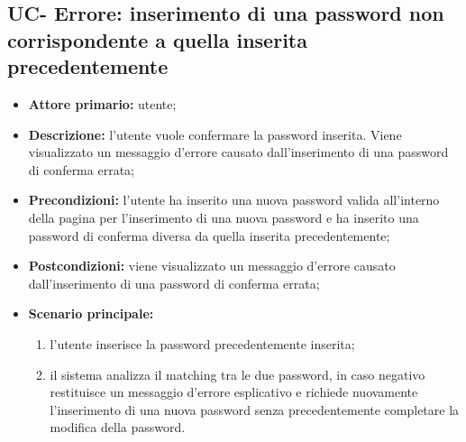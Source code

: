 \subsection{UC- Errore: inserimento di una password non corrispondente a quella inserita precedentemente}
\begin{itemize}
	\item \textbf{Attore primario:} utente;

	\item\textbf{Descrizione:} l'utente vuole confermare la password inserita. Viene visualizzato un messaggio d'errore causato dall'inserimento di una password di conferma errata;

	\item\textbf{Precondizioni:} l'utente ha inserito una nuova password valida all'interno della pagina per l'inserimento di una nuova password e ha inserito una password di conferma diversa da quella inserita precedentemente;

	\item\textbf{Postcondizioni:} viene visualizzato un messaggio d'errore causato dall'inserimento di una password di conferma errata;

	\item \textbf{Scenario principale:}
	      \begin{enumerate}
		      \item l'utente inserisce la password precedentemente inserita;
		      \item il sistema analizza il matching tra le due password, in caso negativo restituisce un messaggio d'errore esplicativo e richiede nuovamente l'inserimento di una nuova password senza precedentemente completare la modifica della password.
	      \end{enumerate}
\end{itemize}

